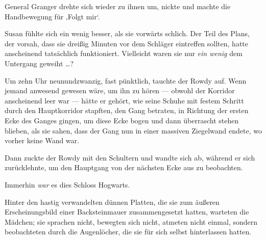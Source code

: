 General Granger drehte sich wieder zu ihnen um, nickte und machte die Handbewegung für ‚Folgt mir‘.

Susan fühlte sich ein wenig besser, als sie vorwärts schlich. Der Teil des Plans, der vorsah, dass sie dreißig Minuten vor dem Schläger eintreffen sollten, hatte anscheinend tatsächlich funktioniert. Vielleicht waren sie nur \emph{ein wenig} dem Untergang geweiht …?

\later

Um zehn Uhr neunundzwanzig, fast pünktlich, tauchte der Rowdy auf. Wenn jemand anwesend gewesen wäre, um ihn zu hören — obwohl der Korridor anscheinend leer war — hätte er gehört, wie seine Schuhe mit festem Schritt durch den Hauptkorridor stapften, den Gang betraten, in Richtung der ersten Ecke des Ganges gingen, um diese Ecke bogen und dann überrascht stehen blieben, als sie sahen, dass der Gang nun in einer massiven Ziegelwand endete, wo vorher keine Wand war.

Dann zuckte der Rowdy mit den Schultern und wandte sich ab, während er sich zurücklehnte, um den Hauptgang von der nächsten Ecke aus zu beobachten.

Immerhin \emph{war} es dies Schloss Hogwarts.

Hinter den hastig verwandelten dünnen Platten, die sie zum äußeren Erscheinungsbild einer Backsteinmauer zusammengesetzt hatten, warteten die Mädchen; sie sprachen nicht, bewegten sich nicht, atmeten nicht einmal, sondern beobachteten durch die Augenlöcher, die sie für sich selbst hinterlassen hatten.

